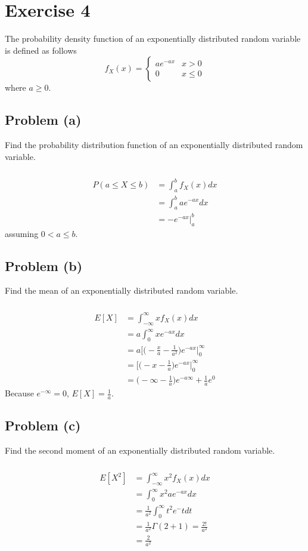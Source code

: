 \documentclass[11pt]{article}
\begin{document}
\section*{Exercise 4}
The probability density function of an exponentially distributed random variable is defined as follows
\begin{equation*}
	f_X(x)=\begin{cases}
		   		ae^{-ax} & x>0 \\
		   		0 & x\leq0 
		   \end{cases}
\end{equation*}
where $a\geq0$.

\subsection*{Problem (a)}
Find the probability distribution function of an exponentially distributed random variable.

\subparagraph*{}
\begin{align*}
	P(a\leq X\leq b) &= \int_a^b f_X(x)dx \\
	&= \int_a^b ae^{-ax}dx \\
	&= -e^{-ax}|_a^b
\end{align*}
assuming $0<a\leq b$.

\subsection*{Problem (b)}
Find the mean of an exponentially distributed random variable.

\subparagraph*{}
\begin{align*}
	E[X] &= \int_{-\infty}^\infty xf_X(x)dx \\
	&= a\int_0^\infty xe^{-ax}dx \\
	&= a\Bigg[\Big(-\frac{x}{a}-\frac{1}{a^2}\Big)e^{-ax}\Bigg|_0^\infty \\
	&= \Bigg[\Big(-x-\frac{1}{a}\Big)e^{-ax}\Bigg|_0^\infty \\
	&= \Big(-\infty-\frac{1}{a}\Big)e^{-a\infty} + \frac{1}{a}e^0
\end{align*}
Because $e^{-\infty}=0$, $E[X]=\frac{1}{a}$.

\subsection*{Problem (c)}
Find the second moment of an exponentially distributed random variable.

\subparagraph*{}
\subparagraph*{}
\begin{align*}
	E[X^2] &= \int_{-\infty}^\infty x^2f_X(x)dx \\
	&= \int_0^\infty x^2ae^{-ax}dx \\
	&= \frac{1}{a^2}\int_0^\infty t^2e^-tdt \\
	&= \frac{1}{a^2}\Gamma(2+1)=\frac{2!}{a^2} \\
	&= \frac{2}{a^2}
\end{align*}
\end{document}
